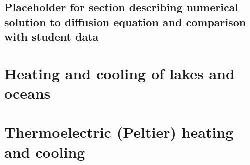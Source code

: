 \subsection{\color{gray} Placeholder for section describing numerical solution to diffusion equation and comparison with student data \color{black}}

\section{\color{gray} Heating and cooling of lakes and oceans \color{black}}
\section{\color{gray} Thermoelectric (Peltier) heating and cooling \color{black}}